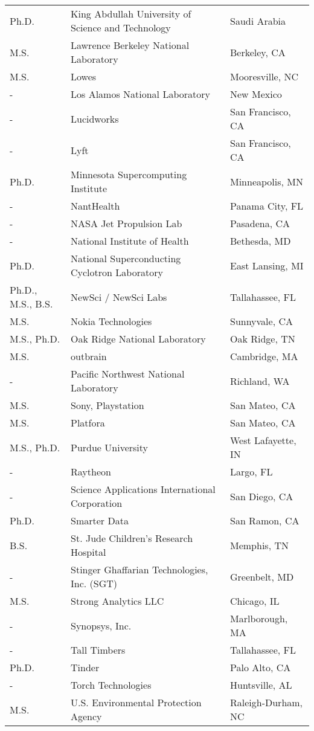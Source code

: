 \documentclass[12pt,a4paper]{article}
\begin{document}
\begin{center}
\begin{tabular}{l p{8cm} l}
Ph.D. & King Abdullah University of Science and Technology & Saudi Arabia \\
M.S. & Lawrence Berkeley National Laboratory & Berkeley, CA \\
M.S. & Lowes & Mooresville, NC \\
- & Los Alamos National Laboratory & New Mexico \\
- & Lucidworks & San Francisco, CA \\
- & Lyft & San Francisco, CA \\
Ph.D. & Minnesota Supercomputing Institute & Minneapolis, MN \\
- & NantHealth & Panama City, FL \\
- & NASA Jet Propulsion Lab & Pasadena, CA \\
- & National Institute of Health & Bethesda, MD \\
Ph.D. & National Superconducting Cyclotron Laboratory & East Lansing, MI \\
Ph.D., M.S., B.S. & NewSci / NewSci Labs & Tallahassee, FL \\
M.S. & Nokia Technologies & Sunnyvale, CA \\
M.S., Ph.D. & Oak Ridge National Laboratory & Oak Ridge, TN \\
M.S. & outbrain & Cambridge, MA \\
- & Pacific Northwest National Laboratory & Richland, WA \\
M.S. & Sony, Playstation & San Mateo, CA \\
M.S. & Platfora & San Mateo, CA \\
M.S., Ph.D. & Purdue University & West Lafayette, IN \\
- & Raytheon & Largo, FL \\
- & Science Applications International Corporation & San Diego, CA \\
Ph.D. & Smarter Data & San Ramon, CA \\
B.S. & St. Jude Children's Research Hospital & Memphis, TN \\
- & Stinger Ghaffarian Technologies, Inc. (SGT) & Greenbelt, MD \\
M.S. & Strong Analytics LLC & Chicago, IL \\
- & Synopsys, Inc. & Marlborough, MA \\
- & Tall Timbers & Tallahassee, FL \\
Ph.D. & Tinder & Palo Alto, CA \\
- & Torch Technologies & Huntsville, AL \\
M.S. & U.S. Environmental Protection Agency & Raleigh-Durham, NC \\

\end{tabular}
\end{center}
\end{document}
